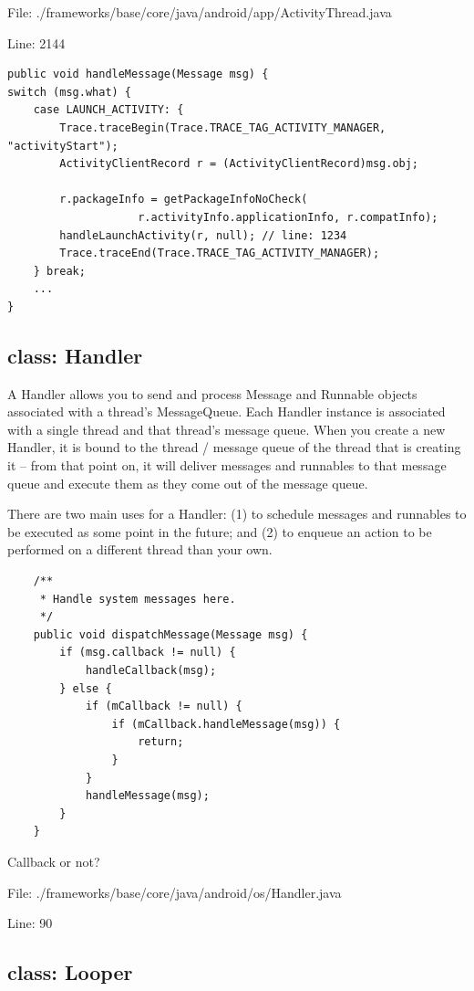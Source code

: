 \documentclass[11pt,a4paper]{article}
\begin{document}
File: ./frameworks/base/core/java/android/app/ActivityThread.java 

Line: 2144

\scriptsize
\begin{verbatim}
public void handleMessage(Message msg) {
switch (msg.what) {
    case LAUNCH_ACTIVITY: {
        Trace.traceBegin(Trace.TRACE_TAG_ACTIVITY_MANAGER, "activityStart");
        ActivityClientRecord r = (ActivityClientRecord)msg.obj;

        r.packageInfo = getPackageInfoNoCheck(
                    r.activityInfo.applicationInfo, r.compatInfo);
        handleLaunchActivity(r, null); // line: 1234
        Trace.traceEnd(Trace.TRACE_TAG_ACTIVITY_MANAGER);
    } break;
    ...
}
\end{verbatim}
\normalsize


\subsection{class: Handler}

A Handler allows you to send and process Message and Runnable objects associated with a thread's MessageQueue. Each Handler instance is associated with a single thread and that thread's message queue. When you create a new Handler, it is bound to the thread / message queue of the thread that is creating it -- from that point on, it will deliver messages and runnables to that message queue and execute them as they come out of the message queue.

There are two main uses for a Handler: (1) to schedule messages and runnables to be executed as some point in the future; and (2) to enqueue an action to be performed on a different thread than your own. 

\scriptsize
\begin{verbatim}
    /**
     * Handle system messages here.
     */
    public void dispatchMessage(Message msg) {
        if (msg.callback != null) {
            handleCallback(msg);
        } else {
            if (mCallback != null) {
                if (mCallback.handleMessage(msg)) {
                    return;
                }
            }
            handleMessage(msg);
        }
    }
\end{verbatim}
\normalsize

Callback or not?

File: ./frameworks/base/core/java/android/os/Handler.java

Line: 90


\subsection{class: Looper}
\end{document}
